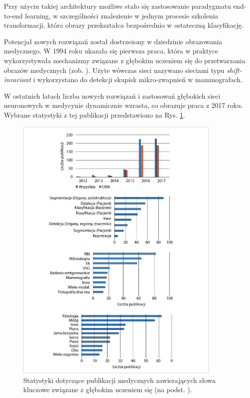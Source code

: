 Przy użyciu takiej architektury możliwe stało się zastosowanie paradygmatu end-to-end learning, w szczególności znalezienie w jednym procesie szkolenia transformacji, która obrazy przekształca bezpośrednio w ostateczną klasyfikację.  

Potencjał nowych rozwiązań został dostrzeżony w dziedzinie obrazowania medycznego. W 1994 roku ukazała się pierwsza praca, która w praktyce wykorzystywała mechanizmy związane z głębokim uczeniem się do przetwarzania obrazów medycznych (zob. \cite{Zhang1994}). Użyte wówczas sieci nazywano sieciami typu \textit{shift-invariant} i wykorzystano do detekcji skupisk mikro-zwapnień w mammografach.

W ostatnich latach liczba nowych rozwiązań i zastosowań głębokich sieci neuronowych w medycynie dynamicznie wzrasta, co obrazuje praca \cite{Litjens2017} z 2017 roku. Wybrane statystyki z tej publikacji przedstawiono na Rys. \ref{DL_CAD_stats}.
\begin{figure}[h!]
	\centering
	\includegraphics[width=0.9\textwidth]{figures/DL_CAD_statystyka.jpg}
	\caption{Statystyki dotyczące publikacji medycznych zawierających słowa kluczowe związane z głębokim uczeniem się (na podst. \cite{Litjens2017}).}
	\label{DL_CAD_stats}
\end{figure}

